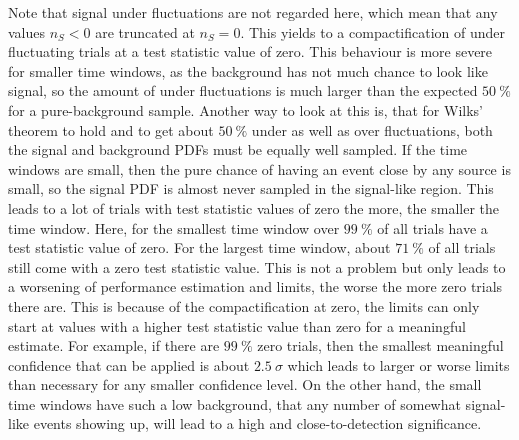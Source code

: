 Note that signal under fluctuations are not regarded here, which mean that any values $n_S < 0$ are truncated at $n_S = 0$.
This yields to a compactification of under fluctuating trials at a test statistic value of zero.
This behaviour is more severe for smaller time windows, as the background has not much chance to look like signal, so the amount of under fluctuations is much larger than the expected $\SI{50}{\percent}$ for a pure-background sample.
Another way to look at this is, that for Wilks' theorem to hold and to get about $\SI{50}{\percent}$ under as well as over fluctuations, both the signal and background PDFs must be equally well sampled.
If the time windows are small, then the pure chance of having an event close by any source is small, so the signal PDF is almost never sampled in the signal-like region.
This leads to a lot of trials with test statistic values of zero the more, the smaller the time window.
Here, for the smallest time window over $\SI{99}{\percent}$ of all trials have a test statistic value of zero.
For the largest time window, about $\SI{71}{\percent}$ of all trials still come with a zero test statistic value.
This is not a problem but only leads to a worsening of performance estimation and limits, the worse the more zero trials there are.
This is because of the compactification at zero, the limits can only start at values with a higher test statistic value than zero for a meaningful estimate.
For example, if there are $\SI{99}{\percent}$ zero trials, then the smallest meaningful confidence that can be applied is about $\SI{2.5}{\sigma}$ which leads to larger or worse limits than necessary for any smaller confidence level.
On the other hand, the small time windows have such a low background, that any number of somewhat signal-like events showing up, will lead to a high and close-to-detection significance.

